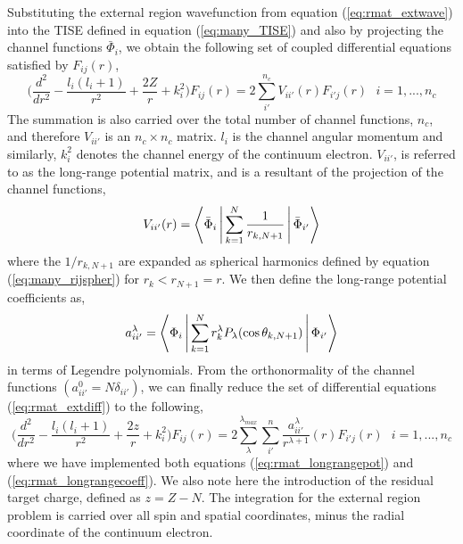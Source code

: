 Substituting the external region wavefunction from equation (\ref{eq:rmat_extwave}) into the TISE defined in equation (\ref{eq:many_TISE}) and also by projecting the channel functions $\bar{\Phi}_i$, we obtain the following set of coupled differential equations satisfied by $F_{ij}(r)$,
\begin{equation}\label{eq:rmat_extdiff}
\Big(\frac{d^2}{dr^2}-\frac{l_i(l_i+1)}{r^2}+\frac{2Z}{r}+k_i^2\Big)F_{ij}(r)=2\sum_{i'}^{n_c}V_{ii'}(r)F_{i'j}(r) ~~~ i=1,...,n_c 
\end{equation}
The summation is also carried over the total number of channel functions, $n_c$, and therefore $V_{ii'}$ is an $n_c \times n_c$ matrix. $l_i$ is the channel angular momentum and similarly, $k_i^2$ denotes the channel energy of the continuum electron. $V_{ii'}$, is referred to as the long-range potential matrix, and is a resultant of the projection of the channel functions,
\begin{equation}\label{eq:rmat_longrangepot}
V_{ii'}(r)=\Braket{\bar{\Phi}_i | \sum_{k=1}^N\frac{1}{r_{k,N+1}}|\bar{\Phi}_{i'}}
\end{equation}
where the $1/r_{k,N+1}$ are expanded as spherical harmonics defined by equation (\ref{eq:many_rijspher}) for $r_k<r_{N+1}=r$. We then define the long-range potential coefficients as,
\begin{equation}\label{eq:rmat_longrangecoeff}
a_{ii'}^\lambda=\Braket{\Phi_i|\sum_{k=1}^Nr_k^\lambda P_\lambda(\cos\theta_{k,N+1})|\Phi_{i'}}
\end{equation}
in terms of Legendre polynomials. From the orthonormality of the channel functions $(a_{ii'}^0=N\delta_{ii'})$, we can finally reduce the set of differential equations (\ref{eq:rmat_extdiff}) to the following,
\begin{equation}\label{eq:rmat_extdiff2}
\Big(\frac{d^2}{dr^2}-\frac{l_i(l_i+1)}{r^2}+\frac{2z}{r}+k_i^2\Big)F_{ij}(r)=2\sum_\lambda^{\lambda_{max}}\sum_{i'}^n\frac{a_{ii'}^\lambda}{r^{\lambda+1}}(r)F_{i'j}(r) ~~~ i=1,...,n_c
\end{equation}
where we have implemented both equations (\ref{eq:rmat_longrangepot}) and (\ref{eq:rmat_longrangecoeff}). We also note here the introduction of the residual target charge, defined as $z=Z-N$. The integration for the external region problem is carried over all spin and spatial coordinates, minus the radial coordinate of the continuum electron.

